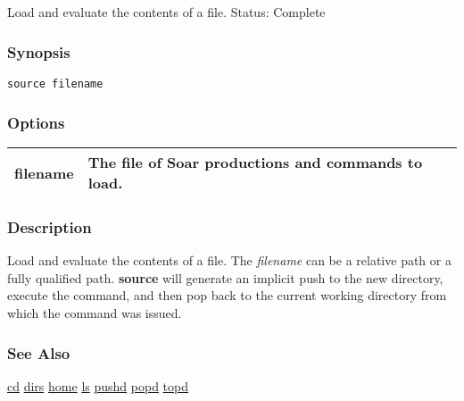 \subsection{}
\label{source}
Load and evaluate the contents of a file. 
 Status: Complete
\subsubsection*{Synopsis}
\begin{verbatim}
source filename
\end{verbatim}
\subsubsection*{Options}
\begin{tabular}{|l|l|}
\hline 
filename & The file of Soar productions and commands to load.  \\
 \hline 
\end{tabular}
\subsubsection*{Description}
 Load and evaluate the contents of a file. The \emph{filename}
 can be a relative path or a fully qualified path. \textbf{source}
 will generate an implicit push to the new directory, execute the command, and then pop back to the current working directory from which the command was issued. 
\subsubsection*{See Also}
\hyperref[cd]{cd} \hyperref[dirs]{dirs} \hyperref[home]{home} \hyperref[ls]{ls} \hyperref[pushd]{pushd} \hyperref[popd]{popd} \hyperref[topd]{topd} 